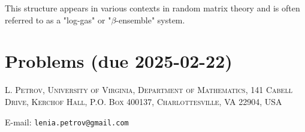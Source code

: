 \documentclass[letterpaper,11pt,oneside,reqno]{article}
\numberwithin{equation}{section}
\theoremstyle{definition}
\begin{document}
This structure appears in various contexts in random matrix theory and is often referred to as a "log-gas" or "$\beta$-ensemble" system.














\appendix
\setcounter{section}{2}

\section{Problems (due 2025-02-22)}
















\medskip

\textsc{L. Petrov, University of Virginia, Department of Mathematics, 141 Cabell Drive, Kerchof Hall, P.O. Box 400137, Charlottesville, VA 22904, USA}

E-mail: \texttt{lenia.petrov@gmail.com}
\end{document}

